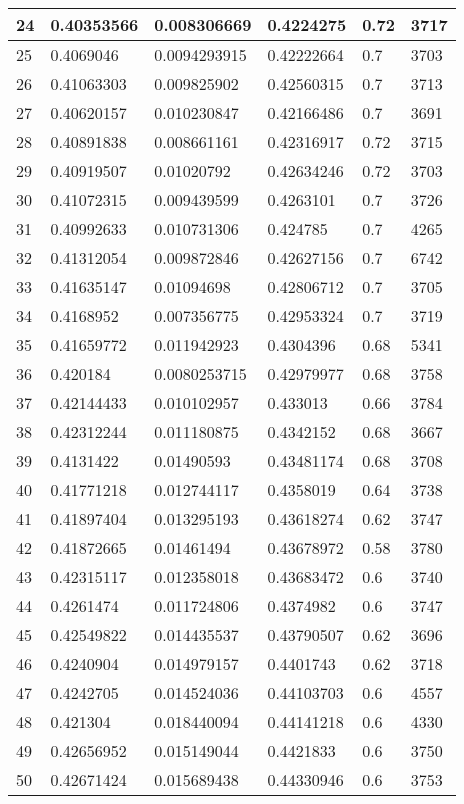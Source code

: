 \begin{longtable}{|l|l|l|l|l|l|}
24 & 0.40353566 & 0.008306669 & 0.4224275 & 0.72 & 3717 \\ \hline 
25 & 0.4069046 & 0.0094293915 & 0.42222664 & 0.7 & 3703 \\ \hline 
26 & 0.41063303 & 0.009825902 & 0.42560315 & 0.7 & 3713 \\ \hline 
27 & 0.40620157 & 0.010230847 & 0.42166486 & 0.7 & 3691 \\ \hline 
28 & 0.40891838 & 0.008661161 & 0.42316917 & 0.72 & 3715 \\ \hline 
29 & 0.40919507 & 0.01020792 & 0.42634246 & 0.72 & 3703 \\ \hline 
30 & 0.41072315 & 0.009439599 & 0.4263101 & 0.7 & 3726 \\ \hline 
31 & 0.40992633 & 0.010731306 & 0.424785 & 0.7 & 4265 \\ \hline 
32 & 0.41312054 & 0.009872846 & 0.42627156 & 0.7 & 6742 \\ \hline 
33 & 0.41635147 & 0.01094698 & 0.42806712 & 0.7 & 3705 \\ \hline 
34 & 0.4168952 & 0.007356775 & 0.42953324 & 0.7 & 3719 \\ \hline 
35 & 0.41659772 & 0.011942923 & 0.4304396 & 0.68 & 5341 \\ \hline 
36 & 0.420184 & 0.0080253715 & 0.42979977 & 0.68 & 3758 \\ \hline 
37 & 0.42144433 & 0.010102957 & 0.433013 & 0.66 & 3784 \\ \hline 
38 & 0.42312244 & 0.011180875 & 0.4342152 & 0.68 & 3667 \\ \hline 
39 & 0.4131422 & 0.01490593 & 0.43481174 & 0.68 & 3708 \\ \hline 
40 & 0.41771218 & 0.012744117 & 0.4358019 & 0.64 & 3738 \\ \hline 
41 & 0.41897404 & 0.013295193 & 0.43618274 & 0.62 & 3747 \\ \hline 
42 & 0.41872665 & 0.01461494 & 0.43678972 & 0.58 & 3780 \\ \hline 
43 & 0.42315117 & 0.012358018 & 0.43683472 & 0.6 & 3740 \\ \hline 
44 & 0.4261474 & 0.011724806 & 0.4374982 & 0.6 & 3747 \\ \hline 
45 & 0.42549822 & 0.014435537 & 0.43790507 & 0.62 & 3696 \\ \hline 
46 & 0.4240904 & 0.014979157 & 0.4401743 & 0.62 & 3718 \\ \hline 
47 & 0.4242705 & 0.014524036 & 0.44103703 & 0.6 & 4557 \\ \hline 
48 & 0.421304 & 0.018440094 & 0.44141218 & 0.6 & 4330 \\ \hline 
49 & 0.42656952 & 0.015149044 & 0.4421833 & 0.6 & 3750 \\ \hline 
50 & 0.42671424 & 0.015689438 & 0.44330946 & 0.6 & 3753 \\ \hline 
\end{longtable}